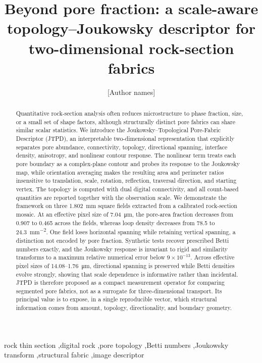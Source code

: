 \documentclass[preprint,12pt,authoryear]{elsarticle}
\begin{document}
\begin{frontmatter}
\title{Beyond pore fraction: a scale-aware topology--Joukowsky descriptor for two-dimensional rock-section fabrics}

\author[aff1]{[Author names]}
\address[aff1]{[Affiliation(s) to be confirmed]}

\begin{abstract}
Quantitative rock-section analysis often reduces microstructure to phase fraction, size, or a small set of shape factors, although structurally distinct pore fabrics can share similar scalar statistics. We introduce the Joukowsky--Topological Pore-Fabric Descriptor (JTPD), an interpretable two-dimensional representation that explicitly separates pore abundance, connectivity, topology, directional spanning, interface density, anisotropy, and nonlinear contour response. The nonlinear term treats each pore boundary as a complex-plane contour and probes its response to the Joukowsky map, while orientation averaging makes the resulting area and perimeter ratios insensitive to translation, scale, rotation, reflection, traversal direction, and starting vertex. The topology is computed with dual digital connectivity, and all count-based quantities are reported together with the observation scale. We demonstrate the framework on three \SI{1.802}{mm} square fields extracted from a calibrated rock-section mosaic. At an effective pixel size of \SI{7.04}{\micro m}, the pore-area fraction decreases from 0.907 to 0.465 across the fields, whereas loop density decreases from 78.5 to \SI{24.3}{mm^{-2}}. One field loses horizontal spanning while retaining vertical spanning, a distinction not encoded by pore fraction. Synthetic tests recover prescribed Betti numbers exactly, and the Joukowsky response is invariant to rigid and similarity transforms to a maximum relative numerical error below $9\times10^{-13}$. Across effective pixel sizes of 14.08--\SI{1.76}{\micro m}, directional spanning is preserved while Betti densities evolve strongly, showing that scale dependence is informative rather than incidental. JTPD is therefore proposed as a compact measurement operator for comparing segmented pore fabrics, not as a surrogate for three-dimensional transport. Its principal value is to expose, in a single reproducible vector, which structural information comes from amount, topology, directionality, and boundary geometry.
\end{abstract}

\begin{keyword}
rock thin section \sep digital rock \sep pore topology \sep Betti numbers \sep Joukowsky transform \sep structural fabric \sep image descriptor
\end{keyword}
\end{frontmatter}
\end{document}
